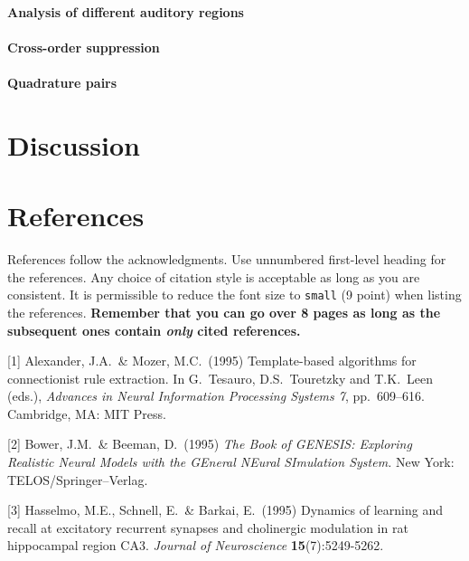 \documentclass{article}
\begin{document}
\paragraph{Analysis of different auditory regions}
\paragraph{Cross-order suppression}
\paragraph{Quadrature pairs}


\section{Discussion}

\section*{References}

References follow the acknowledgments. Use unnumbered first-level
heading for the references. Any choice of citation style is acceptable
as long as you are consistent. It is permissible to reduce the font
size to \verb+small+ (9 point) when listing the references. {\bf
  Remember that you can go over 8 pages as long as the subsequent ones contain
  \emph{only} cited references.}
\medskip

\small

[1] Alexander, J.A.\ \& Mozer, M.C.\ (1995) Template-based algorithms
for connectionist rule extraction. In G.\ Tesauro, D.S.\ Touretzky and
T.K.\ Leen (eds.), {\it Advances in Neural Information Processing
  Systems 7}, pp.\ 609--616. Cambridge, MA: MIT Press.

[2] Bower, J.M.\ \& Beeman, D.\ (1995) {\it The Book of GENESIS:
  Exploring Realistic Neural Models with the GEneral NEural SImulation
  System.}  New York: TELOS/Springer--Verlag.

[3] Hasselmo, M.E., Schnell, E.\ \& Barkai, E.\ (1995) Dynamics of
learning and recall at excitatory recurrent synapses and cholinergic
modulation in rat hippocampal region CA3. {\it Journal of
  Neuroscience} {\bf 15}(7):5249-5262.
\end{document}
